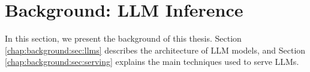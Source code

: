 \chapter{Background: LLM Inference}
\label{chap:background}

In this section, we present the background of this thesis. Section \ref{chap:background:sec:llms} describes the architecture of LLM models, and Section \ref{chap:background:sec:serving} explains the main techniques used to serve LLMs.



